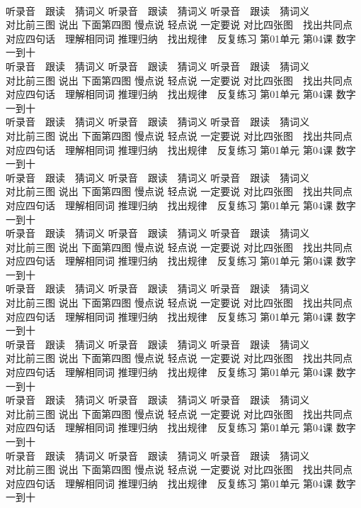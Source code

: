\documentclass[8pt]{extreport}
\begin{document}
\begin{CJK}{UTF8}{min}
\\	听录音　跟读　猜词义 听录音　跟读　猜词义 听录音　跟读　猜词义 
\\	对比前三图 说出 下面第四图 慢点说 轻点说 一定要说	对比四张图　找出共同点 对应四句话　理解相同词 推理归纳　找出规律　反复练习 第01单元 第04课 数字一到十
\\	听录音　跟读　猜词义 听录音　跟读　猜词义 听录音　跟读　猜词义 
\\	对比前三图 说出 下面第四图 慢点说 轻点说 一定要说	对比四张图　找出共同点 对应四句话　理解相同词 推理归纳　找出规律　反复练习 第01单元 第04课 数字一到十
\\	听录音　跟读　猜词义 听录音　跟读　猜词义 听录音　跟读　猜词义 
\\	对比前三图 说出 下面第四图 慢点说 轻点说 一定要说	对比四张图　找出共同点 对应四句话　理解相同词 推理归纳　找出规律　反复练习 第01单元 第04课 数字一到十
\\	听录音　跟读　猜词义 听录音　跟读　猜词义 听录音　跟读　猜词义 
\\	对比前三图 说出 下面第四图 慢点说 轻点说 一定要说	对比四张图　找出共同点 对应四句话　理解相同词 推理归纳　找出规律　反复练习 第01单元 第04课 数字一到十
\\	听录音　跟读　猜词义 听录音　跟读　猜词义 听录音　跟读　猜词义 
\\	对比前三图 说出 下面第四图 慢点说 轻点说 一定要说	对比四张图　找出共同点 对应四句话　理解相同词 推理归纳　找出规律　反复练习 第01单元 第04课 数字一到十
\\	听录音　跟读　猜词义 听录音　跟读　猜词义 听录音　跟读　猜词义 
\\	对比前三图 说出 下面第四图 慢点说 轻点说 一定要说	对比四张图　找出共同点 对应四句话　理解相同词 推理归纳　找出规律　反复练习 第01单元 第04课 数字一到十
\\	听录音　跟读　猜词义 听录音　跟读　猜词义 听录音　跟读　猜词义 
\\	对比前三图 说出 下面第四图 慢点说 轻点说 一定要说	对比四张图　找出共同点 对应四句话　理解相同词 推理归纳　找出规律　反复练习 第01单元 第04课 数字一到十
\\	听录音　跟读　猜词义 听录音　跟读　猜词义 听录音　跟读　猜词义 
\\	对比前三图 说出 下面第四图 慢点说 轻点说 一定要说	对比四张图　找出共同点 对应四句话　理解相同词 推理归纳　找出规律　反复练习 第01单元 第04课 数字一到十
\\	听录音　跟读　猜词义 听录音　跟读　猜词义 听录音　跟读　猜词义 
\\	对比前三图 说出 下面第四图 慢点说 轻点说 一定要说	对比四张图　找出共同点 对应四句话　理解相同词 推理归纳　找出规律　反复练习 第01单元 第04课 数字一到十

\end{CJK}
\end{document}
